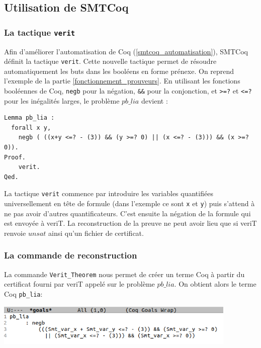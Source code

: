 \documentclass[11pt]{article}
\begin{document}
\subsection{Utilisation de SMTCoq}

\subsubsection{La tactique \texttt{verit}}

Afin d'améliorer l'automatisation de Coq (\ref{smtcoq_automatisation}), SMTCoq définit la tactique \texttt{verit}. Cette nouvelle tactique permet de résoudre automatiquement les buts dans les booléens en forme prénexe. On reprend l'exemple de la partie \ref{fonctionnement_prouveurs}. En utilisant les fonctions booléennes de Coq, \texttt{negb} pour la négation, \texttt{\&\&} pour la conjonction, et \texttt{>=?} et \texttt{<=?} pour les inégalités larges, le problème $pb\_lia$ devient :

\begin{lstlisting}[frame=single]
Lemma pb_lia : 
  forall x y,
    negb ( ((x+y <=? - (3)) && (y >=? 0) || (x <=? - (3))) && (x >=? 0)).
Proof.
    verit.
Qed.
\end{lstlisting}

La tactique \texttt{verit} commence par introduire les variables quantifiées universellement en tête de formule (dans l'exemple ce sont \texttt{x} et \texttt{y}) puis s'attend à ne pas avoir d'autres quantificateurs. C'est ensuite la négation de la formule qui est envoyée à veriT. La reconstruction de la preuve ne peut avoir lieu que si veriT renvoie $unsat$ ainsi qu'un fichier de certificat.

\subsubsection{La commande de reconstruction}

La commande \texttt{Verit\_Theorem} nous permet de créer un terme Coq à partir du certificat fourni par veriT appelé sur le problème $pb\_lia$. On obtient alors le terme Coq \texttt{pb\_lia}:
\begin{center}
\includegraphics[height=2cm]{pb_lia.png}
\end{center}
\end{document}
